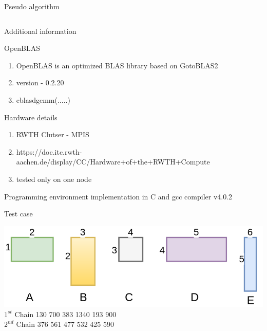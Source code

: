 \documentclass[10pts]{beamer}
\begin{document}
\begin{frame}{Pseudo algorithm}
\begin{columns}
	 		
	 		\end{columns}	
	 	\end{frame} 
	 
	      \begin{frame}{Additional information}
	      	
	      	
	      	\begin{block}{OpenBLAS}
	      		\begin{enumerate}[(\roman{*})]
	      			\item	OpenBLAS is an optimized BLAS library based on GotoBLAS2 
	      			\item version - 0.2.20\\
	      			\item cblas\textunderscore dgemm(.....)   	
	      		\end{enumerate}
	      	\end{block}
	      	
	      	\begin{block}{Hardware details}
	      		\begin{enumerate}[(\roman{*})]
	      			\item RWTH Clutser - MPI\textunderscore S
	      			\item https://doc.itc.rwth-aachen.de/display/CC/Hardware+of+the+RWTH+Compute
	      			\item tested only on one node 	
	      		\end{enumerate}
	      	\end{block} 
	      	
	      	\begin{block}{Programming environment}
	      		implementation in C and gcc compiler v4.0.2	
	      	\end{block} 
	      	
	      \end{frame}
	    
	      
	      \begin{frame}{Test case}
	      	\begin{center}
	      		\includegraphics[scale =0.3]{chain_matrix_numero.png}\\
	      		\vspace{20pt}
	      			$1^{st}$ Chain   130 700 383 1340 193 900 \\
	      			\vspace{10pt}
	      			$2^{nd}$ Chain   376 561 477 532 425 590 
	      	\end{center}
	      
	      	
	      \end{frame}
	  
\end{document}
